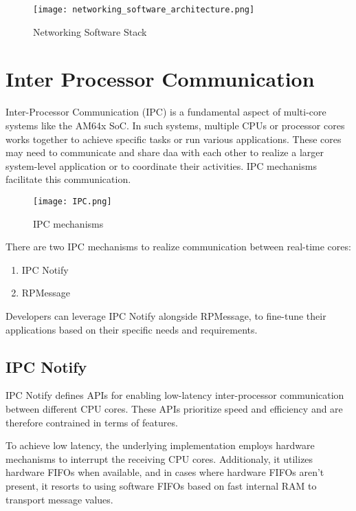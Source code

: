\begin{figure}[ht]
    \centering
    \texttt{[image: networking\_software\_architecture.png]}
    \caption{Networking Software Stack}
\end{figure}

\section{Inter Processor Communication}

Inter-Processor Communication (IPC) is a fundamental aspect of multi-core
systems like the AM64x SoC. In such systems, multiple CPUs or processor cores
works together to achieve specific tasks or run various applications.
These cores may need to communicate and share daa with each other to realize a
larger system-level application or to coordinate their activities.
IPC mechanisms facilitate this communication.

\begin{figure}[ht]
    \centering
    \texttt{[image: IPC.png]}
    \caption{IPC mechanisms}
\end{figure}

There are two IPC mechanisms to realize communication between real-time cores:

\begin{enumerate}
    \item   IPC Notify
    \item   RPMessage
\end{enumerate}

Developers can leverage IPC Notify alongside RPMessage, to fine-tune their
applications based on their specific needs and requirements.

\subsection{IPC Notify}

IPC Notify defines APIs for enabling low-latency inter-processor communication
between different CPU cores. These APIs prioritize speed and efficiency and are
therefore contrained in terms of features.

To achieve low latency, the underlying implementation employs hardware
mechanisms to interrupt the receiving CPU cores. Additionaly, it utilizes
hardware FIFOs when available, and in cases where hardware FIFOs aren't
present, it resorts to using software FIFOs based on fast internal RAM to
transport message values.


